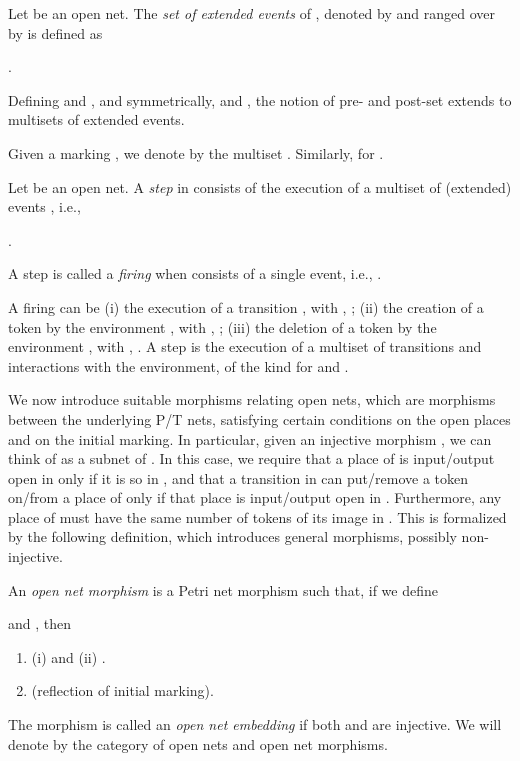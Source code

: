 \documentclass{LMCS}
\begin{document}
\begin{defi}
  Let  be an open net.
The \emph{set of extended events} of , denoted by  and
  ranged over by  is defined as
  \begin{center}
    .
  \end{center}
Defining  and , and symmetrically,
   and , the notion of pre- and
  post-set extends 
  to multisets of extended events.
\end{defi}

 Given a
marking , we  denote by  the multiset
.
Similarly,  for .   

\begin{defi}
  Let  be an open net.  A \emph{step} in  consists of the execution of a
  multiset of (extended) events , i.e.,
  \begin{center}
    .
  \end{center}
  A step is called a \emph{firing} when  consists of a single event, i.e.,
  .
\end{defi}
A firing can be (i) the execution of a
transition , with , ;
(ii) the creation of a token by the environment ,
with , ;
(iii) the deletion of a token by the environment ,
with , .
A step is the execution of a multiset of transitions and
interactions with the environment, of the kind  for  
and .





We now introduce suitable morphisms relating open nets, which are
morphisms between the underlying P/T nets, satisfying certain
conditions on the open places and on the initial marking. In
particular, given an injective morphism , we can
think of  as a subnet of .  In this case, we require
that a place of  is input/output open in  only if 
it is so in , and that a transition in  can
put/remove a token on/from a place of  only if that place is
input/output open in . Furthermore, any place of  must have
the same number of tokens of its image in . This is formalized
by the following definition, which introduces general morphisms,
possibly non-injective.

\begin{defi}
  \label{de:open-net-morphism}
  An \emph{open net morphism}  is a Petri net
  morphism  such that, if we define

and
,
then

  \begin{enumerate}[(1)]
  \item
(i)   and
    (ii)
    .


  \item  (reflection of initial marking).

  \end{enumerate}

  \noindent
  The morphism  is called an \emph{open net embedding} if both
   and  are injective.
We will denote by  the category of open nets and
  open net morphisms.
\end{defi}
\end{document}
